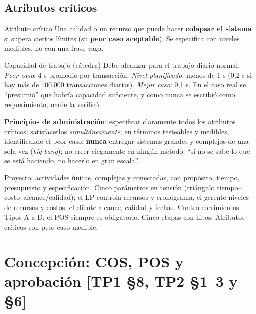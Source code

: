 \documentclass[11pt,a4paper]{article}
\begin{document}
\subsection{Atributos críticos}
\begin{defbox}{Atributo crítico}
Una calidad o un recurso que puede hacer \textbf{colapsar el sistema} si supera ciertos límites (su
\textbf{peor caso aceptable}). Se especifica con niveles medibles, no con una frase vaga.
\end{defbox}
\begin{ejemplo}{Capacidad de trabajo (cátedra)}
Debe alcanzar para el trabajo diario normal. \emph{Peor caso}: 4 s promedio por transacción. \emph{Nivel
planificado}: menos de 1 s (0,2 s si hay más de 100.000 transacciones diarias). \emph{Mejor caso}: 0,1 s. En el
caso real se ``presumió'' que habría capacidad suficiente, y como nunca se escribió como requerimiento, nadie la
verificó.
\end{ejemplo}
\textbf{Principios de administración}: especificar claramente todos los atributos críticos; satisfacerlos
\emph{simultáneamente}; en términos testeables y medibles, identificando el peor caso; \textbf{nunca} entregar
sistemas grandes y complejos de una sola vez (\emph{big-bang}); no creer ciegamente en ningún método; ``si no se
sabe lo que se está haciendo, no hacerlo en gran escala''.

\begin{enresumen}
Proyecto: actividades únicas, complejas y conectadas, con propósito, tiempo, presupuesto y especificación.
Cinco parámetros en tensión (triángulo tiempo--costo--alcance/calidad); el LP controla recursos y cronograma,
el gerente niveles de recursos y costos, el cliente alcance, calidad y fechas. Cuatro corrimientos. Tipos A a
D; el POS siempre es obligatorio. Cinco etapas con hitos. Atributos críticos con peor caso medible.
\end{enresumen}

\section[Concepción: COS, POS y aprobación]{Concepción: COS, POS y aprobación \hfill {\normalsize [TP1 §8, TP2 §1--3 y §6]}}
\end{document}
